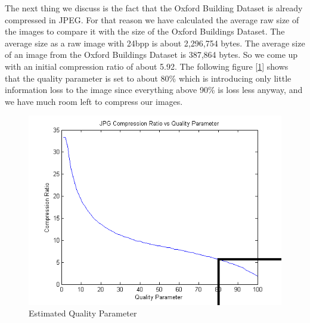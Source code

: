 \documentclass[10pt,a4paper]{article}
\begin{document}
The next thing we discuss is the fact that the Oxford Building Dataset is already compressed in JPEG. For that reason we have calculated the average raw size of the images to compare it with the size of the Oxford Buildings Dataset. The average size as a raw image with 24bpp is about 2,296,754 bytes. The average size of an image from the Oxford Buildings Dataset is 387,864 bytes. So we come up with an initial compression ratio of about 5.92. The following figure [\ref{fig:jpg_ratio}] shows that the quality parameter is set to about 80\% which is introducing only little information loss to the image since everything above 90\% is loss less anyway, and we have much room left to compress our images.
\begin{figure}[!htp]
	\includegraphics[width=\textwidth]{img/jpg-ratio.png}
	\caption{Estimated Quality Parameter}
  \label{fig:jpg_ratio}
\end{figure}
\end{document}
